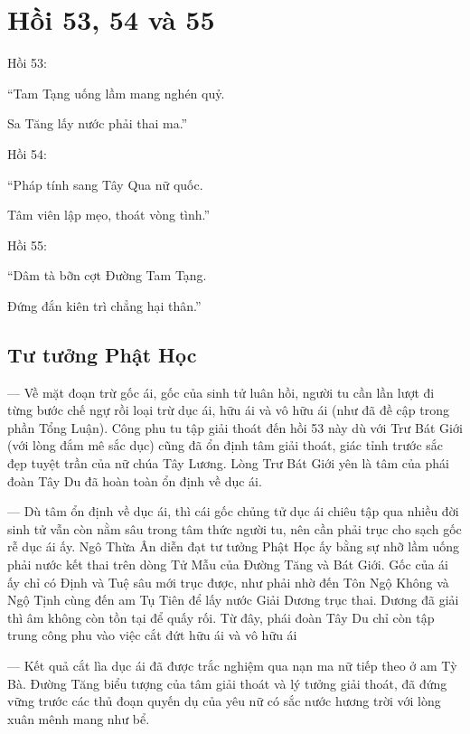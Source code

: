 \chapter{Hồi 53, 54 và 55} %
\label{cha:hoi_53_54}

Hồi 53:

\begin{itshape}
``Tam Tạng uống lầm mang nghén quỷ.

Sa Tăng lấy nước phải thai ma.''
\end{itshape}

Hồi 54:

\begin{itshape}
``Pháp tính sang Tây Qua nữ quốc.

Tâm viên lập mẹo, thoát vòng tình.''
\end{itshape}

Hồi 55:

\begin{itshape}
``Dâm tà bỡn cợt Đường Tam Tạng.

Đứng đắn kiên trì chẳng hại thân.''
\end{itshape}

\section{Tư tưởng Phật Học} %
\label{sec:53_54_phat_hoc}

— Về mặt đoạn trừ gốc ái, gốc của sinh tử luân hồi, người tu cần lần lượt đi từng bước chế ngự rồi loại trừ dục ái, hữu ái và vô hữu ái (như đã đề cập trong phần Tổng Luận). Công phu tu tập giải thoát đến hồi 53 này dù với Trư Bát Giới (với lòng đắm mê sắc dục) cũng đã ổn định tâm giải thoát, giác tỉnh trước sắc đẹp tuyệt trần của nữ chúa Tây Lương. Lòng Trư Bát Giới yên là tâm của phái đoàn Tây Du đã hoàn toàn ổn định về dục ái.

— Dù tâm ổn định về dục ái, thì cái gốc chủng tử dục ái chiêu tập qua nhiều đời sinh tử vẫn còn nằm sâu trong tâm thức người tu, nên cần phải trục cho sạch gốc rễ dục ái ấy. Ngô Thừa Ân diễn đạt tư tưởng Phật Học ấy bằng sự nhỡ lầm uống phải nước kết thai trên dòng Tử Mẫu của Đường Tăng và Bát Giới. Gốc của ái ấy chỉ có Định và Tuệ sâu mới trục được, như phải nhờ đến Tôn Ngộ Không và Ngộ Tịnh cùng đến am Tụ Tiên để lấy nước Giải Dương trục thai. Dương đã giải thì âm không còn tồn tại để quấy rối. Từ đây, phái đoàn Tây Du chỉ còn tập trung công phu vào việc cắt đứt hữu ái và vô hữu ái

— Kết quả cắt lìa dục ái đã được trắc nghiệm qua nạn ma nữ tiếp theo ở am Tỳ Bà. Đường Tăng biểu tượng của tâm giải thoát và lý tưởng giải thoát, đã đứng vững trước các thủ đoạn quyến dụ của yêu nữ có sắc nước hương trời với lòng xuân mênh mang như bể.

